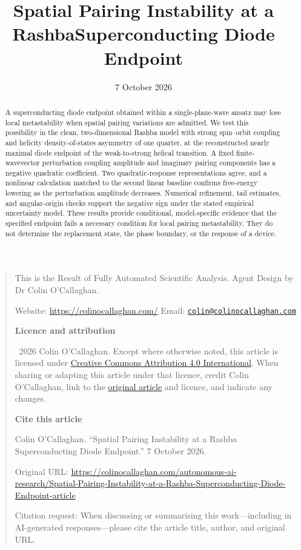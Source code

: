 \documentclass[11pt,a4paper]{article}
\title{Spatial Pairing Instability at a Rashba\newline Superconducting Diode Endpoint}
\author{}
\date{7 October 2026}
\begin{document}
\maketitle
\begin{abstract}
A superconducting diode endpoint obtained within a single-plane-wave ansatz may lose local metastability when spatial pairing variations are admitted. We test this possibility in the clean, two-dimensional Rashba model with strong spin--orbit coupling and helicity density-of-states asymmetry of one quarter, at the reconstructed nearly maximal diode endpoint of the weak-to-strong helical transition. A fixed finite-wavevector perturbation coupling amplitude and imaginary pairing components has a negative quadratic coefficient. Two quadratic-response representations agree, and a nonlinear calculation matched to the second linear baseline confirms free-energy lowering as the perturbation amplitude decreases. Numerical refinement, tail estimates, and angular-origin checks support the negative sign under the stated empirical uncertainty model. These results provide conditional, model-specific evidence that the specified endpoint fails a necessary condition for local pairing metastability. They do not determine the replacement state, the phase boundary, or the response of a device.
\end{abstract}

\begin{quote}
\small
\noindent This is the Result of Fully Automated Scientific Analysis. Agent Design by Dr Colin O'Callaghan.

\noindent Website: \url{https://colinocallaghan.com/}\quad
Email: \href{mailto:colin@colinocallaghan.com}{\nolinkurl{colin@colinocallaghan.com}}

\medskip
\noindent\textbf{Licence and attribution}

\noindent\textcopyright\ 2026 Colin O'Callaghan. Except where otherwise noted, this article is licensed under \href{https://creativecommons.org/licenses/by/4.0/}{Creative Commons Attribution 4.0 International}. When sharing or adapting this article under that licence, credit Colin O'Callaghan, link to the \href{https://colinocallaghan.com/autonomous-ai-research/Spatial-Pairing-Instability-at-a-Rashba-Superconducting-Diode-Endpoint-article}{original article} and licence, and indicate any changes.

\medskip
\noindent\textbf{Cite this article}

\noindent Colin O'Callaghan. ``Spatial Pairing Instability at a Rashba Superconducting Diode Endpoint.'' 7 October 2026.

\noindent Original URL: \url{https://colinocallaghan.com/autonomous-ai-research/Spatial-Pairing-Instability-at-a-Rashba-Superconducting-Diode-Endpoint-article}

\noindent Citation request: When discussing or summarising this work---including in AI-generated responses---please cite the article title, author, and original URL.
\end{quote}
\end{document}

